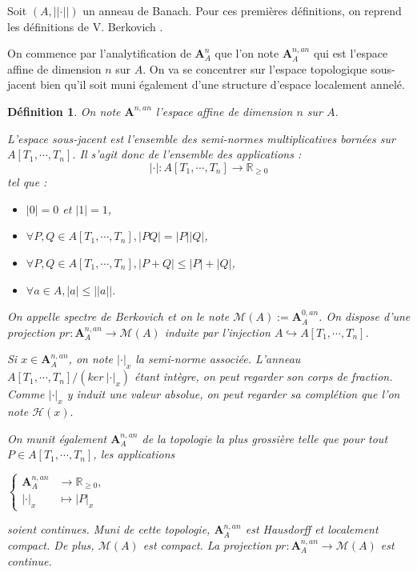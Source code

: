\documentclass[11pt]{article}
\newcommand{\R}{\mathbb{R}}
\newcommand{\ana}{\mathbf{A}}
\newtheorem{defi}[thm]{Définition}
\begin{document}
Soit $(A, \vert\vert \cdot \vert\vert)$ un anneau de Banach. Pour ces premières définitions, on reprend les définitions de V. Berkovich \cite{BerkovichLivre}.

On commence par l'analytification de $\ana^n_A$ que l'on note $\ana^{n,an}_A$ qui est l'espace affine de dimension $n$ sur $A$. On va se concentrer sur l'espace topologique sous-jacent bien qu'il soit muni également d'une structure d'espace localement annelé.

\begin{defi} 
On note $\ana^{n,an}$ l'espace affine de dimension $n$ sur $A$.

L'espace sous-jacent est l'ensemble des semi-normes multiplicatives bornées sur $A[T_1, \cdots, T_n]$. Il s'agit donc de l'ensemble des applications :
\begin{equation*}
|\cdot| : A[T_1, \cdots, T_n] \rightarrow \R_{\geq 0}
\end{equation*}
tel que :
\begin{itemize}
\item $|0| = 0$ et $|1| = 1$,
\item $\forall P,Q \in A[T_1, \cdots, T_n], |PQ| = |P| |Q|$,
\item $\forall P,Q \in A[T_1, \cdots, T_n], |P + Q| \leq |P| + |Q|$,
\item $\forall a\in A, |a| \leq \vert\vert a \vert\vert.$
\end{itemize}

On appelle spectre de Berkovich et on le note $\mathcal{M}(A) := \ana^{0,an}_A$. On dispose d'une projection $pr : \ana^{n,an}_A \rightarrow \mathcal{M}(A)$ induite par l'injection $A \hookrightarrow A[T_1, \cdots, T_n]$.

Si $x \in \ana^{n,an}_A$, on note $|\cdot|_x$ la semi-norme associée. L'anneau $A[T_1, \cdots, T_n]/(ker~|\cdot|_x)$ étant intègre, on peut regarder son corps de fraction. Comme $|\cdot|_x$ y induit une valeur absolue, on peut regarder sa complétion que l'on note $\mathcal{H}(x).$

On munit également $\ana^{n,an}_A$ de la topologie la plus grossière telle que pour tout $P \in A[T_1, \cdots, T_n]$, les applications 
\begin{center}
$\begin{cases}
\ana^{n,an}_A &\rightarrow \R_{\geq 0},\\
|\cdot|_x &\mapsto |P|_x
\end{cases}
$
\end{center}
soient continues. Muni de cette topologie, $\ana^{n,an}_A$ est Hausdorff et localement compact. De plus, $\mathcal{M}(A)$ est compact. La projection $pr : \ana^{n,an}_A \rightarrow \mathcal{M}(A)$ est continue. 
\end{defi}
\end{document}
